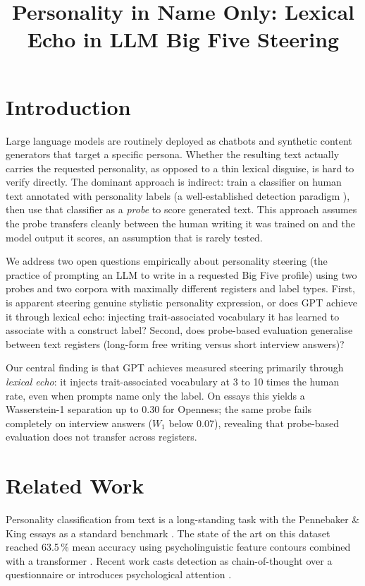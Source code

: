 \documentclass[10pt, a4paper]{article}
\title{Personality in Name Only: Lexical Echo in LLM Big Five Steering}
\begin{document}
\maketitleabstract

\section{Introduction}

Large language models are routinely deployed as chatbots and synthetic content generators that target a specific persona. Whether the resulting text actually carries the requested personality, as opposed to a thin lexical disguise, is hard to verify directly. The dominant approach is indirect: train a classifier on human text annotated with personality labels \citep{yang-etal-2023-psycot,kerz-etal-2022-pushing} (a well-established detection paradigm \citep{v-ganesan-etal-2023-systematic}), then use that classifier as a \emph{probe} to score generated text. This approach assumes the probe transfers cleanly between the human writing it was trained on and the model output it scores, an assumption that is rarely tested.

We address two open questions empirically about personality steering (the practice of prompting an LLM to write in a requested Big Five profile) using two probes and two corpora with maximally different registers and label types. First, is apparent steering genuine stylistic personality expression, or does GPT achieve it through lexical echo: injecting trait-associated vocabulary it has learned to associate with a construct label? Second, does probe-based evaluation generalise between text registers (long-form free writing versus short interview answers)?

Our central finding is that GPT achieves measured steering primarily through \emph{lexical echo}: it injects trait-associated vocabulary at 3 to 10 times the human rate, even when prompts name only the label. On essays this yields a Wasserstein-1 separation up to 0.30 for Openness; the same probe fails completely on interview answers ($W_1$ below 0.07), revealing that probe-based evaluation does not transfer across registers.

\section{Related Work}

Personality classification from text is a long-standing task with the Pennebaker \& King essays as a standard benchmark \citep{pennebaker-king-1999,mehta-etal-2020-bottom}. The state of the art on this dataset reached 63.5\,\% mean accuracy using psycholinguistic feature contours combined with a transformer \citep{kerz-etal-2022-pushing}. Recent work casts detection as chain-of-thought over a questionnaire \citep{yang-etal-2023-psycot} or introduces psychological attention \citep{zhang-etal-2023-psyattention}.
\end{document}
